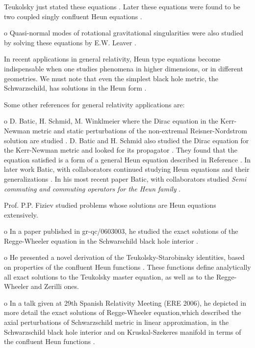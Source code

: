\documentclass{article}
\begin{document}
\noindent Teukolsky just stated these equations \cite{Teukolsky}. Later these
equations were found to be two coupled singly confluent Heun
equations \cite {batic13}.


o Quasi-normal modes of rotational gravitational singularities
were also studied by solving these equations by E.W. Leaver
\cite{slav87}.




\noindent In recent applications in general relativity, Heun type
equations become indispensable when one studies phenomena in
higher dimensions, or in different geometries.   We must note that even the
simplest black hole metric, the Schwarzschild, has solutions
 in the Heun form \cite {fiziev1} \cite {philipp}.

\noindent
Some other references for general relativity applications
are:



o D. Batic, H. Schmid, M. Winklmeier where the Dirac equation in
the Kerr-Newman metric and static perturbations of the
non-extremal Reisner-Nordstrom solution are studied \cite{schmid}.
D. Batic and H. Schmid also studied the Dirac equation for the
Kerr-Newman metric and looked for its propagator \cite{batic}.
They found that the equation satisfied is a form of a general Heun
equation described in Reference \cite{schmid}. In later work
Batic, with collaborators continued studying Heun equations and
their generalizations \cite{batic2}.
In his most recent paper Batic, with collaborators studied \emph{ Semi commuting and commuting operators for the Heun family} \cite {batic3}.

\noindent Prof. P.P. Fiziev studied problems whose solutions are
Heun equations extensively.


o In a paper published in gr-qc/0603003, he studied the exact
solutions of the Regge-Wheeler equation in the Schwarschild black
hole interior \cite {fiziev1}.


o He presented a novel derivation of the Teukolsky-Starobinsky
identities, based on properties of the confluent Heun functions
\cite {fiziev3}. These functions define analytically all exact
solutions to the Teukolsky master equation, as well as to the
Regge-Wheeler and Zerilli ones.


o In a talk given at 29th Spanish Relativity Meeting (ERE 2006),
he depicted in more detail the exact solutions of Regge-Wheeler
equation,which described the axial perturbations of Schwarzschild
metric in linear approximation, in the Schwarzschild black hole
interior and on Kruskal-Szekeres manifold in terms of the
confluent Heun functions \cite{fiziev6}.
\end{document}
